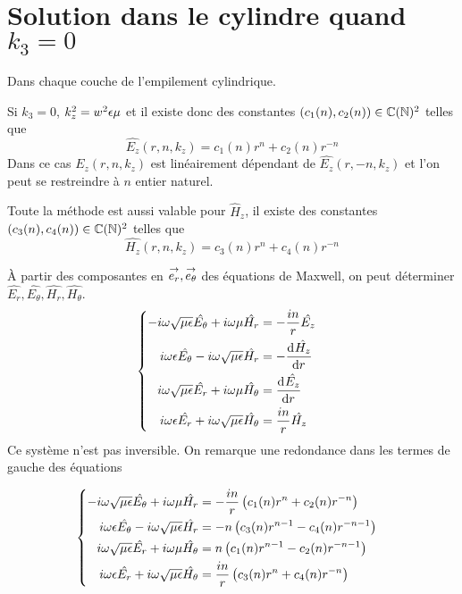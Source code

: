 \section[Solution dans le cylindre quand k3 = 0]{Solution dans le cylindre quand \(k_3 = 0\)}
  \label{sec:annexe:cylindre:k3_nul}

  Dans chaque couche de l'empilement cylindrique.

  Si \(k_3 = 0\), \(k_z^2 = w^2\eps\mu\) et il existe donc des constantes \((c_1(n),c_2(n)) \in \CC(\NN)^2\) telles que
  \begin{equation*}
    \hat{E_z}(r,n,k_z) = c_1(n) r^n + c_2(n)r^{-n}
  \end{equation*}
  Dans ce cas \(\hat{E_z}(r,n,k_z)\) est linéairement dépendant de  \(\hat{E_z}(r,-n,k_z)\) et l'on peut se restreindre à \(n\) entier naturel.

  Toute la méthode est aussi valable pour \(\hat H_z\), il existe des constantes \((c_3(n),c_4(n)) \in \CC(\NN)^2\) telles que
  \begin{equation*}
    \hat{H_z}(r,n,k_z) = c_3(n) r^n + c_4(n)r^{-n}
  \end{equation*}

  À partir des composantes en \(\vect{e_r},\vect{e_\theta}\) des équations de Maxwell, on peut déterminer \(\hat{E_r},\hat{E_\theta},\hat{H_r},\hat{H_\theta}\).
  \begin{align*}
      &\left\lbrace
      \begin{aligned}
          -i\w\sqrt{\mu\eps}\hat{E_\theta} + i\w\mu \hat{H_r} &= -\frac{in}{r}\hat{E_z}
          \\
          i\w\eps \hat{E_\theta} - i\w\sqrt{\mu\eps} \hat{H_r} &= -\ddp{r}{\hat{H_z}}            
          \\
          i\w\sqrt{\mu\eps}\hat{E_r} + i\w\mu \hat{H_\theta} &= \ddp{r}{\hat{E_z}}
          \\
          i\w\eps \hat{E_r} + i\w\sqrt{\mu\eps} \hat{H_\theta} &= \frac{in}{r}\hat{H_z}
      \end{aligned}
      \right.
  \end{align*}
  Ce système n'est pas inversible. On remarque une redondance dans les termes de gauche des équations

  \begin{align*}
      &\left\lbrace
      \begin{aligned}
          -i\w\sqrt{\mu\eps}\hat{E_\theta} + i\w\mu \hat{H_r} &= -\frac{in}{r}\left(c_1(n) r^n + c_2(n)r^{-n}\right)
          \\
          i\w\eps \hat{E_\theta} - i\w\sqrt{\mu\eps} \hat{H_r} &= -n\left(c_3(n)r^{n-1} - c_4(n)r^{-n-1}\right)           
          \\
          i\w\sqrt{\mu\eps}\hat{E_r} + i\w\mu \hat{H_\theta} &= n\left(c_1(n)r^{n-1} - c_2(n)r^{-n-1}\right)
          \\
          i\w\eps \hat{E_r} + i\w\sqrt{\mu\eps} \hat{H_\theta} &= \frac{in}{r}\left(c_3(n) r^n + c_4(n)r^{-n}\right)
      \end{aligned}
      \right.
  \end{align*}

